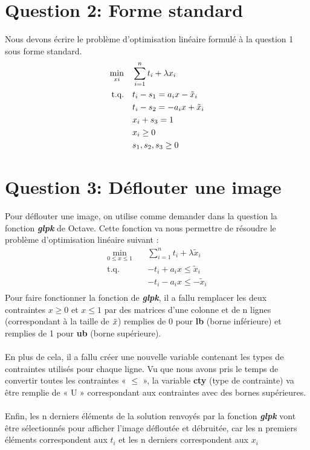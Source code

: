 \documentclass{rapport}
\begin{document}
\section{Question 2: Forme standard}

Nous devons écrire le problème d’optimisation linéaire formulé à la question 1 sous forme standard.
\begin{equation}
    \begin{aligned}
        \min_{xi} \quad&\sum_{i=1}^n t_i + \lambda x_i\\
        \textrm{t.q.} \quad 
            &t_i -s_1= a_i x-\Tilde{x}_i\\
            &t_i -s_2= -a_i x+\Tilde{x}_i\\
            &x_i + s_3 = 1\\
            &x_i \ge 0\\
            &s_1, s_2, s_3 \ge 0
    \end{aligned}
\end{equation}

\section{Question 3: Déflouter une image}

Pour déflouter une image, on utilise comme demander dans la question la fonction \textbf{\textit{glpk}} de Octave. Cette fonction va nous permettre de résoudre le problème d’optimisation linéaire suivant :
\begin{equation}
    \begin{aligned}
        \min_{0 \le x \le 1} \quad&\sum_{i=1}^n t_i + \lambda \tilde{x}_i\\
        \textrm{t.q.} \quad & -t_i+a_i x \le \tilde{x}_i\\
        & -t_i-a_i x \le - \tilde{x}_i\\
    \end{aligned}
\end{equation}
Pour faire fonctionner la fonction de \textbf{\textit{glpk}}, il a fallu remplacer les deux contraintes $x\ge 0$ et $x \le 1$ par des matrices d'une colonne et de n lignes (correspondant à la taille de $\Tilde{x}$) remplies de 0 pour {\bf lb} (borne inférieure) et remplies de 1 pour {\bf ub} (borne supérieure).\\\\
En plus de cela, il a fallu créer une nouvelle variable contenant les types de contraintes utilisés pour chaque ligne. Vu que nous avons pris le temps de convertir toutes les contraintes « $\le$ », la variable {\bf cty} (type de contrainte) va être remplie de « U » correspondant aux contraintes avec des bornes supérieures.\\\\
Enfin, les n derniers éléments de la solution renvoyés par la fonction \textbf{\textit{glpk}} vont être sélectionnés pour afficher l’image défloutée et débruitée, car les n premiers éléments correspondent aux $t_i$ et les n derniers correspondent aux $x_i$
\end{document}
